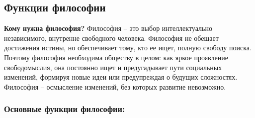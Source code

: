 \documentclass[
]{article}
\begin{document}
\hypertarget{ux444ux443ux43dux43aux446ux438ux438-ux444ux438ux43bux43eux441ux43eux444ux438ux438}{%
\subsection{Функции
философии}\label{ux444ux443ux43dux43aux446ux438ux438-ux444ux438ux43bux43eux441ux43eux444ux438ux438}}

\textbf{Кому нужна философия?} Философия -- это выбор интеллектуально
независимого, внутренне свободного человека. Философия не обещает
достижения истины, но обеспечивает тому, кто ее ищет, полную свободу
поиска. Поэтому философия необходима обществу в целом: как яркое
проявление свободомыслия, она постоянно ищет и предугадывает пути
социальных изменений, формируя новые идеи или предупреждая о будущих
сложностях. Философия -- осмысление изменений, без которых развитие
невозможно.

\hypertarget{ux43eux441ux43dux43eux432ux43dux44bux435-ux444ux443ux43dux43aux446ux438ux438-ux444ux438ux43bux43eux441ux43eux444ux438ux438}{%
\subsubsection{Основные функции
философии:}\label{ux43eux441ux43dux43eux432ux43dux44bux435-ux444ux443ux43dux43aux446ux438ux438-ux444ux438ux43bux43eux441ux43eux444ux438ux438}}
\end{document}
